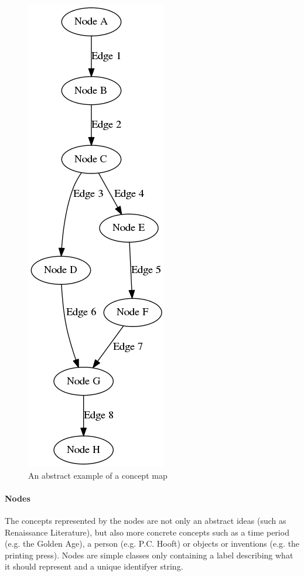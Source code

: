 \begin{figure}
\centering
    \includegraphics[height=.6\textheight]{img/examplemap.png}
    \caption{An abstract example of a concept map}
    \label{fig:examplemap}
\end{figure}

\paragraph{Nodes} The concepts represented by the nodes are not only an abstract ideas (such as Renaissance Literature), but also more concrete concepts such as a time period (e.g. the Golden Age), a person (e.g. P.C. Hooft) or objects or inventions (e.g. the printing press). Nodes are simple classes only containing a label describing what it should represent and a unique identifyer string.

